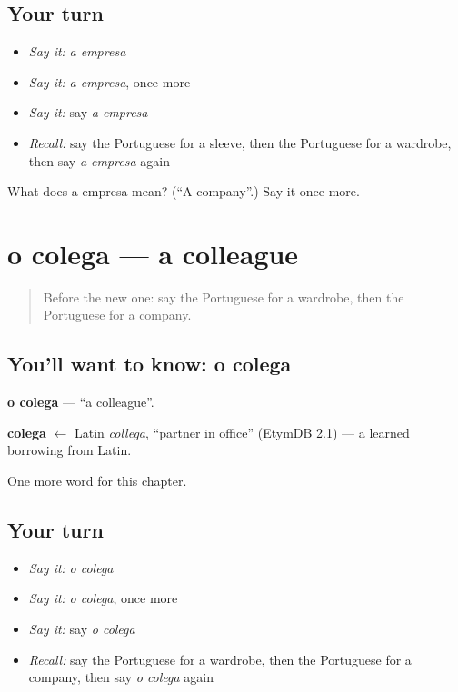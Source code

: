\subsection*{Your turn}
\begin{itemize}
\raggedright
  \item \emph{Say it:} \emph{a empresa}
  \item \emph{Say it:} \emph{a empresa}, once more
  \item \emph{Say it:} say \emph{a empresa}
  \item \emph{Recall:} say the Portuguese for a sleeve, then the Portuguese for a wardrobe, then say \emph{a empresa} again
\end{itemize}

\begin{tcolorbox}[breakable,colback=teal!4,colframe=teal!35!black,title={Before you move on}]
What does a empresa mean? (\textquotedblleft{}A company\textquotedblright{}.) Say it once more.
\end{tcolorbox}
\section[o colega]{o colega — a colleague}

\label{lesson:PT-C170-colega}



\begin{quote}
Before the new one: say the Portuguese for a wardrobe, then the Portuguese for a company.
\end{quote}

\subsection*{You'll want to know: o colega}
\textbf{o colega} — \textquotedblleft{}a colleague\textquotedblright{}.

\begin{cousinweb}
\textbf{colega} $\leftarrow$ Latin \emph{collega}, \textquotedblleft{}partner in office\textquotedblright{} (EtymDB 2.1) — a learned borrowing from Latin.
\end{cousinweb}

\begin{grammarlens}[title={What you've built}]
One more word for this chapter.
\end{grammarlens}

\subsection*{Your turn}
\begin{itemize}
\raggedright
  \item \emph{Say it:} \emph{o colega}
  \item \emph{Say it:} \emph{o colega}, once more
  \item \emph{Say it:} say \emph{o colega}
  \item \emph{Recall:} say the Portuguese for a wardrobe, then the Portuguese for a company, then say \emph{o colega} again
\end{itemize}

